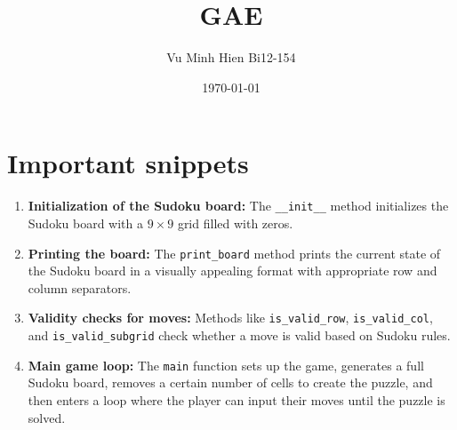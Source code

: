 \documentclass{article}
\begin{document}
\title{GAE}
\author{Vu Minh Hien Bi12-154}
\date{\today}

\maketitle


\maketitle



\section{Important snippets}
\begin{enumerate}
    \item \textbf{Initialization of the Sudoku board:} The \texttt{\_\_init\_\_} method initializes the Sudoku board with a $9 \times 9$ grid filled with zeros.

    \item \textbf{Printing the board:} The \texttt{print\_board} method prints the current state of the Sudoku board in a visually appealing format with appropriate row and column separators.

    \item \textbf{Validity checks for moves:} Methods like \texttt{is\_valid\_row}, \texttt{is\_valid\_col}, and \texttt{is\_valid\_subgrid} check whether a move is valid based on Sudoku rules.

    \item \textbf{Main game loop:} The \texttt{main} function sets up the game, generates a full Sudoku board, removes a certain number of cells to create the puzzle, and then enters a loop where the player can input their moves until the puzzle is solved.
\end{enumerate}
\end{document}
